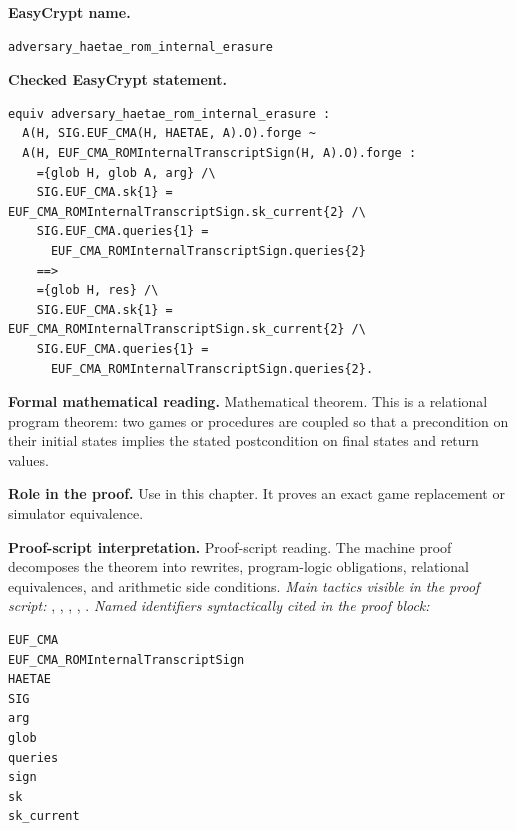 \begin{formaltheorem}
\noindent\textbf{EasyCrypt name.}
\begin{lstlisting}[language=EasyCrypt,basicstyle=\ttfamily\scriptsize]
adversary_haetae_rom_internal_erasure
\end{lstlisting}
\noindent\textbf{Checked EasyCrypt statement.}
\begin{lstlisting}[language=EasyCrypt,basicstyle=\ttfamily\scriptsize]
equiv adversary_haetae_rom_internal_erasure :
  A(H, SIG.EUF_CMA(H, HAETAE, A).O).forge ~
  A(H, EUF_CMA_ROMInternalTranscriptSign(H, A).O).forge :
    ={glob H, glob A, arg} /\
    SIG.EUF_CMA.sk{1} = EUF_CMA_ROMInternalTranscriptSign.sk_current{2} /\
    SIG.EUF_CMA.queries{1} =
      EUF_CMA_ROMInternalTranscriptSign.queries{2}
    ==>
    ={glob H, res} /\
    SIG.EUF_CMA.sk{1} = EUF_CMA_ROMInternalTranscriptSign.sk_current{2} /\
    SIG.EUF_CMA.queries{1} =
      EUF_CMA_ROMInternalTranscriptSign.queries{2}.
\end{lstlisting}
\noindent\textbf{Formal mathematical reading.}
Mathematical theorem. This is a relational program theorem: two games or procedures are coupled so that a precondition on their initial states implies the stated postcondition on final states and return values.

\noindent\textbf{Role in the proof.}
Use in this chapter. It proves an exact game replacement or simulator equivalence.

\noindent\textbf{Proof-script interpretation.}
Proof-script reading. The machine proof decomposes the theorem into rewrites, program-logic obligations, relational equivalences, and arithmetic side conditions.
\emph{Main tactics visible in the proof script:} \ec{proc}, \ec{inline}, \ec{wp}, , .
\emph{Named identifiers syntactically cited in the proof block:}
\begin{lstlisting}[language=EasyCrypt,basicstyle=\ttfamily\scriptsize]
EUF_CMA
EUF_CMA_ROMInternalTranscriptSign
HAETAE
SIG
arg
glob
queries
sign
sk
sk_current
\end{lstlisting}

\end{formaltheorem}

